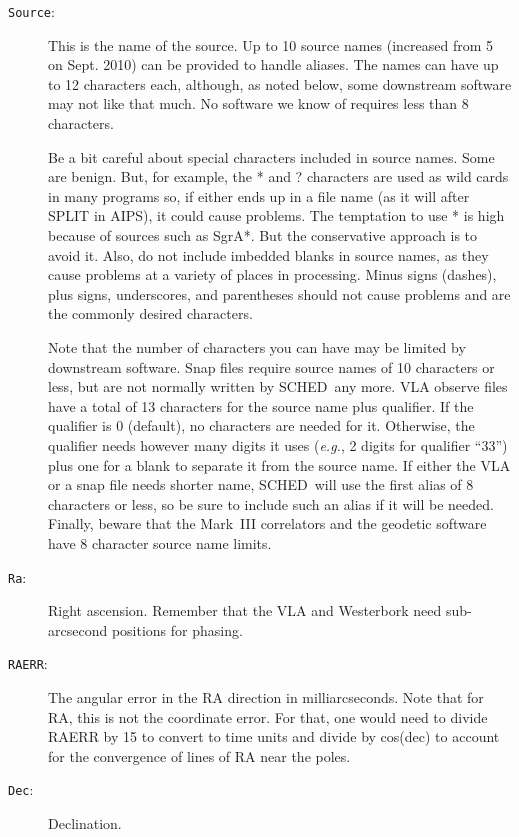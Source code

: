 \documentclass{report}
\newcommand{\schedb}{{\sc SCHED~}}
\begin{document}
\begin{description}

\item [{\tt Source}:] This is the name of the source.  Up to 10 source
names (increased from 5 on Sept. 2010) can be provided to handle
aliases.  The names can have up to 12 characters each, although, as
noted below, some downstream software may not like that much.  No
software we know of requires less than 8 characters.

Be a bit careful about special characters included in source names.
Some are benign.  But, for example, the * and ? characters are used as
wild cards in many programs so, if either ends up in a file name (as
it will after SPLIT in AIPS), it could cause problems.  The temptation
to use * is high because of sources such as SgrA*.  But the
conservative approach is to avoid it.  Also, do not include imbedded
blanks in source names, as they cause problems at a variety of places
in processing.  Minus signs (dashes), plus signs, underscores, and
parentheses should not cause problems and are the commonly desired
characters.

Note that the number of characters you can have may be limited by
downstream software.  Snap files require source names of 10 characters
or less, but are not normally written by \schedb any more.  VLA
observe files have a total of 13 characters for the source name plus
qualifier. If the qualifier is 0 (default), no characters are needed
for it. Otherwise, the qualifier needs however many digits it uses
({\em e.g.}, 2 digits for qualifier ``33'') plus one for a blank to
separate it from the source name. If either the VLA or a snap file
needs shorter name, \schedb will use the first alias of 8 characters
or less, so be sure to include such an alias if it will be needed.
Finally, beware that the Mark~III correlators and the geodetic
software have 8 character source name limits.

\item [{\tt Ra}:] Right ascension. Remember that the VLA and
Westerbork need sub-arcsecond positions for phasing.

\item [{\tt RAERR}:] The angular error in the RA direction in
milliarcseconds.  Note that for RA, this is not the coordinate error.
For that, one would need to divide RAERR by 15 to convert to time units
and divide by cos(dec) to account for the convergence of lines of RA
near the poles.

\item [{\tt Dec}:] Declination.


\end{description}
\end{document}

